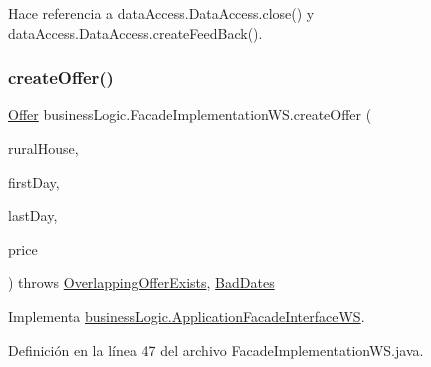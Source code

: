 Hace referencia a data\+Access.\+Data\+Access.\+close() y data\+Access.\+Data\+Access.\+create\+Feed\+Back().

\mbox{\label{classbusiness_logic_1_1_facade_implementation_w_s_ac7b3bdfd0815ea7c787da312de594cce}} 
\subsubsection{\texorpdfstring{createOffer()}{createOffer()}}
{\footnotesize\ttfamily \mbox{\hyperlink{classdomain_1_1_offer}{Offer}} business\+Logic.\+Facade\+Implementation\+W\+S.\+create\+Offer (\begin{DoxyParamCaption}\item[{\mbox{\hyperlink{classdomain_1_1_rural_house}{Rural\+House}}}]{rural\+House,  }\item[{Date}]{first\+Day,  }\item[{Date}]{last\+Day,  }\item[{float}]{price }\end{DoxyParamCaption}) throws \mbox{\hyperlink{classexceptions_1_1_overlapping_offer_exists}{Overlapping\+Offer\+Exists}}, \mbox{\hyperlink{classexceptions_1_1_bad_dates}{Bad\+Dates}}}



Implementa \mbox{\hyperlink{interfacebusiness_logic_1_1_application_facade_interface_w_s_a0e8d2135ef1384a32e74f60bcea55f09}{business\+Logic.\+Application\+Facade\+Interface\+WS}}.



Definición en la línea 47 del archivo Facade\+Implementation\+W\+S.\+java.


\begin{DoxyCode}{0}

\end{DoxyCode}


